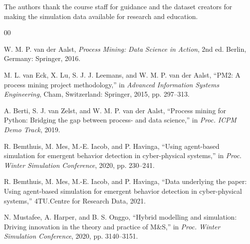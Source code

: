 \documentclass[conference]{IEEEtran}
\begin{document}
The authors thank the course staff for guidance and the dataset creators for making the simulation data available for research and education.

\begin{thebibliography}{00}

W. M. P. van der Aalst, \textit{Process Mining: Data Science in Action}, 2nd ed. Berlin, Germany: Springer, 2016.

M. L. van Eck, X. Lu, S. J. J. Leemans, and W. M. P. van der Aalst, ``PM2: A process mining project methodology,'' in \textit{Advanced Information Systems Engineering}, Cham, Switzerland: Springer, 2015, pp. 297--313.

A. Berti, S. J. van Zelst, and W. M. P. van der Aalst, ``Process mining for Python: Bridging the gap between process- and data science,'' in \textit{Proc. ICPM Demo Track}, 2019.

R. Bemthuis, M. Mes, M.-E. Iacob, and P. Havinga, ``Using agent-based simulation for emergent behavior detection in cyber-physical systems,'' in \textit{Proc. Winter Simulation Conference}, 2020, pp. 230--241.

R. Bemthuis, M. Mes, M.-E. Iacob, and P. Havinga, ``Data underlying the paper: Using agent-based simulation for emergent behavior detection in cyber-physical systems,'' 4TU.Centre for Research Data, 2021.

N. Mustafee, A. Harper, and B. S. Onggo, ``Hybrid modelling and simulation: Driving innovation in the theory and practice of M\&S,'' in \textit{Proc. Winter Simulation Conference}, 2020, pp. 3140--3151.

\end{thebibliography}
\end{document}
